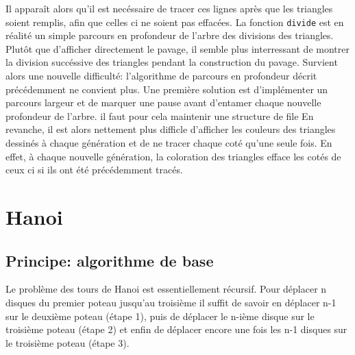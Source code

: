 \documentclass[a4paper, 11pt]{article}%
\begin{document}
		Il apparaît alors qu'il est necéssaire de tracer ces
                lignes après que les triangles soient remplis, afin
                que celles ci ne soient pas effacées.
		La fonction \texttt{divide} est en réalité un simple
                parcours en profondeur de l'arbre des divisions des triangles.		
		Plutôt que d'afficher directement le pavage, il semble
                plus interressant de montrer la division succéssive
                des triangles pendant la construction du
                pavage. Survient alors une nouvelle difficulté:
                l'algorithme de parcours en profondeur décrit
                précédemment ne convient plus. 
		Une première solution est d'implémenter un parcours
                largeur et de marquer une pause avant d'entamer chaque
                nouvelle profondeur de l'arbre. il faut pour cela
                maintenir une structure de file   En revanche, il est
                alors nettement plus difficle d'afficher les couleurs
                des triangles dessinés à chaque génération et de ne
               tracer chaque coté qu'une seule fois. En effet, à
                chaque nouvelle génération, la coloration des
                triangles efface les cotés de ceux ci si ils ont été
                précédemment tracés. 


\section{Hanoi}

	\subsection{Principe: algorithme de base}
		Le problème des tours de Hanoi est essentiellement récursif. Pour
		déplacer n disques du premier poteau jusqu'au troisième
		il suffit de savoir en déplacer n-1 sur le deuxième poteau (étape 1), puis
		de déplacer le n-ième disque sur le troisième poteau (étape 2) et enfin de
		déplacer encore une fois les n-1 disques sur le troisième poteau (étape 3).
\end{document}
